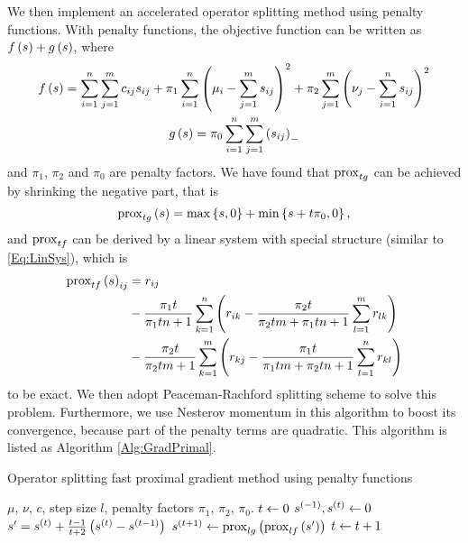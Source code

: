 \documentclass[english]{pkupaper}
\begin{document}
We then implement an accelerated operator splitting method using penalty functions. With penalty functions, the objective function can be written as $ f \left( s \right) + g \left( s \right) $, where
\begin{gather}
f \left( s \right) = \sum_{ {i} = {1} }^{n}{\sum_{ {j} = {1} }^{m}{ c_{ i j } s_{ i j } }} + \pi_1 \sum_{ {i} = {1} }^{n}{\left(  \mu_i - \sum_{ {j} = {1} }^{m}{s_{ i j }}  \right)^2} + \pi_2 \sum_{ {j} = {1} }^{m}{\left(  \nu_j - \sum_{ {i} = {1} }^{n}{s_{ i j }}  \right)^2} \\
g \left( s \right) = \pi_0 \sum_{ {i} = {1} }^{n}{\sum_{ {j} = {1} }^{m}{\left( s_{ i j } \right)_-}}
\end{gather}
and $\pi_1$, $\pi_2$ and $\pi_0$ are penalty factors.
We have found that $ \operatorname{\mathrm{prox}}_{ t g } $ can be achieved by shrinking the negative part, that is
\begin{equation}
\operatorname{\mathrm{prox}}_{ t g } \left( s \right) = \max \left\{  s, 0  \right\} + \min \left\{  s + t \pi_0, 0  \right\},
\end{equation}
and $ \operatorname{\mathrm{prox}}_{ t f } $ can be derived by  a linear system with special structure (similar to \eqref{Eq:LinSys}), which is
\begin{equation}
\begin{split}
\operatorname{\mathrm{prox}}_{ t f } \left( s \right)_{ i j } &= r_{ i j } \\
&- \frac{ \pi_1 t }{ \pi_1 t n + 1 } \sum_{ {k} = {1} }^{n}{\left(  r_{ i k } - \frac{ \pi_2 t }{ \pi_2 t m + \pi_1 t n + 1 } \sum_{ {l} = {1} }^{m}{r_{ l k }}  \right)} \\
&- \frac{ \pi_2 t }{ \pi_2 t m + 1 } \sum_{ {k} = {1} }^{m}{\left(  r_{ k j } - \frac{ \pi_1 t }{ \pi_1 t m + \pi_2 t n + 1 } \sum_{ {l} = {1} }^{n}{r_{ k l }}  \right)}
\end{split}
\end{equation}
to be exact. We then adopt Peaceman-Rachford splitting scheme to solve this problem. Furthermore, we use Nesterov momentum in this algorithm to boost its convergence, because part of the penalty terms are quadratic. This algorithm is listed as Algorithm \ref{Alg:GradPrimal}.

\begin{algorithm}
\caption{Operator splitting fast proximal gradient method using penalty functions}
\label{Alg:GradPrimal}
\begin{algorithmic}
\REQUIRE $\mu$, $\nu$, $c$, step size $l$, penalty factors $\pi_1$, $\pi_2$, $\pi_0$.
\STATE $ t \leftarrow 0 $
\STATE $ s^{\left( -1 \right)}, s^{\left( t \right)} \leftarrow 0 $
\STATE $ s' = s^{\left( t \right)} + \frac{ t - 1 }{ t + 2 } \left(  s^{\left( t \right)} - s^{\left(  t - 1  \right)}  \right) $
\STATE $ s^{\left(  t + 1  \right)} \leftarrow \operatorname{\mathrm{prox}}_{ l g } \left(  \operatorname{\mathrm{prox}}_{ l f } \left( s' \right)  \right) $
\STATE $ t \leftarrow t + 1 $
\ENDWHILE
\end{algorithmic}
\end{algorithm}
\end{document}
